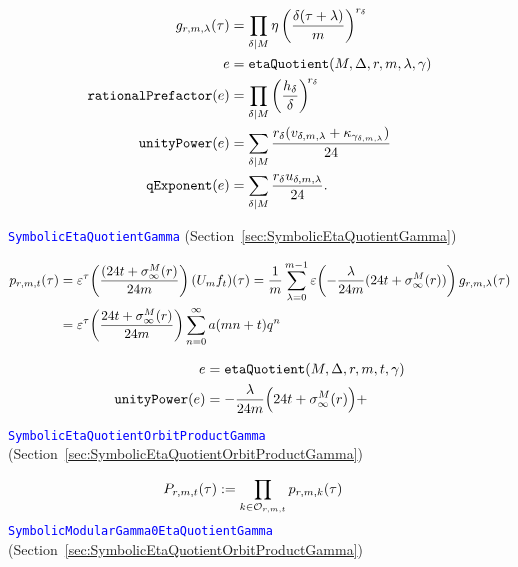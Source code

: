 \documentclass{article}
\begin{document}
\begin{align*}
  g_{r,m,\lambda}(\tau)
  &=
    \divisorprod{M}
    \eta\left(\frac{\delta(\tau+\lambda)}{m}\right)^{r_\delta}
  \\
  e &= \mathtt{etaQuotient}(M, \Delta, r, m, \lambda , \gamma)
  \\
  \mathtt{rationalPrefactor}(e)
  &=
    \divisorprod{M} \left(\frac{h_\delta}{\delta}\right)^{\!r_\delta}
  \\
  \mathtt{unityPower}(e)
  &=
    \divisorsum{M} \frac{r_\delta(v_{\delta,m,\lambda} +
                         \kappa_{\gamma_{\delta,m,\lambda}})}{24}
  \\
  \mathtt{qExponent}(e)
  &=
    \divisorsum{M} \frac{r_\delta u_{\delta,m,\lambda}}{24}.
\end{align*}

\textcolor{blue}{\texttt{SymbolicEtaQuotientGamma}}
(Section~\ref{sec:SymbolicEtaQuotientGamma})

\begin{align*}
  p_{r,m,t}(\tau)
  &=
    \unityPowerTau{\frac{(24t+\sigmainfty[M]{r}}{24m} } (U_mf_t)(\tau)
    =
    \frac{1}{m} \sum_{\lambda=0}^{m-1}
    \unityPower{-\frac{\lambda}{24m} (24t+\sigmainfty[M]{r})}
    g_{r,m,\lambda}(\tau)
  \\
  &=
    \unityPowerTau{\frac{24t+\sigmainfty[M]{r}}{24m}}
    \sum_{n=0}^\infty a(mn+t) q^n
\end{align*}



\begin{align*}
  e &= \mathtt{etaQuotient}(M, \Delta, r, m, t, \gamma)
  \\
  \mathtt{unityPower}(e)
  &=
    -\frac{\lambda}{24m}\Bigl(24t+\sigmainfty[M]{r}\Bigr) +
\end{align*}



\textcolor{blue}{\texttt{SymbolicEtaQuotientOrbitProductGamma}}
(Section~\ref{sec:SymbolicEtaQuotientOrbitProductGamma})

\begin{align*}
  P_{r, m, t}(\tau)
  &:=
    \prod_{k \in \modularOrbit{r,m,t}}
    p_{r,m,k}(\tau)
\end{align*}
\textcolor{blue}{\texttt{SymbolicModularGamma0EtaQuotientGamma}}
(Section~\ref{sec:SymbolicEtaQuotientOrbitProductGamma})
\end{document}

